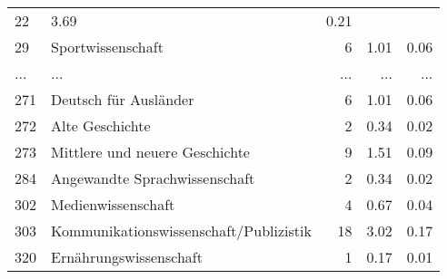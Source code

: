 \begin{longtable}{lXrrr}
          \num{22} &
          \num[round-mode=places,round-precision=2]{3.69} &
          \num[round-mode=places,round-precision=2]{0.21} \\
        29 & \multicolumn{1}{X}{Sportwissenschaft} & %
          \num{6} &
          \num[round-mode=places,round-precision=2]{1.01} &
          \num[round-mode=places,round-precision=2]{0.06} \\
       ... & ... & ... & ... & ... \\
        271 & \multicolumn{1}{X}{Deutsch für Ausländer} & %
          \num{6} &
          \num[round-mode=places,round-precision=2]{1.01} &
          \num[round-mode=places,round-precision=2]{0.06} \\

        272 & \multicolumn{1}{X}{Alte Geschichte} & %
          \num{2} &
          \num[round-mode=places,round-precision=2]{0.34} &
          \num[round-mode=places,round-precision=2]{0.02} \\

        273 & \multicolumn{1}{X}{Mittlere und neuere Geschichte} & %
          \num{9} &
          \num[round-mode=places,round-precision=2]{1.51} &
          \num[round-mode=places,round-precision=2]{0.09} \\

        284 & \multicolumn{1}{X}{Angewandte Sprachwissenschaft} & %
          \num{2} &
          \num[round-mode=places,round-precision=2]{0.34} &
          \num[round-mode=places,round-precision=2]{0.02} \\

        302 & \multicolumn{1}{X}{Medienwissenschaft} & %
          \num{4} &
          \num[round-mode=places,round-precision=2]{0.67} &
          \num[round-mode=places,round-precision=2]{0.04} \\

        303 & \multicolumn{1}{X}{Kommunikationswissenschaft/Publizistik} & %
          \num{18} &
          \num[round-mode=places,round-precision=2]{3.02} &
          \num[round-mode=places,round-precision=2]{0.17} \\

        320 & \multicolumn{1}{X}{Ernährungswissenschaft} & %
          \num{1} &
          \num[round-mode=places,round-precision=2]{0.17} &
          \num[round-mode=places,round-precision=2]{0.01} \\


\end{longtable}
